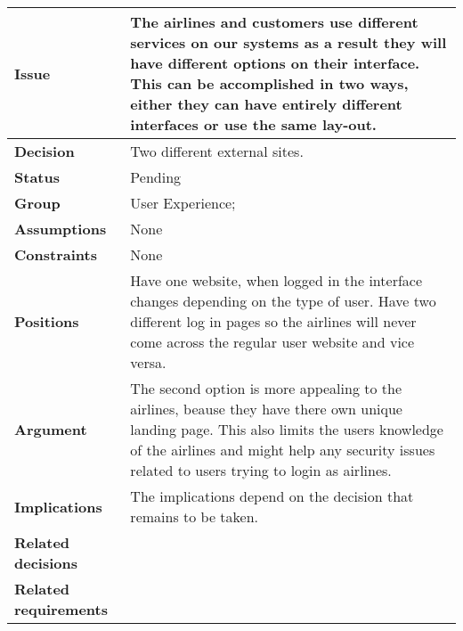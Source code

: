 
\begin{tabular}{ l  p{10cm}}
\hline
\bf Issue & The airlines and customers use different services on our systems as a result they will have different options on their interface. This can be accomplished in two ways, either they can have entirely different interfaces or use the same lay-out. \\
\hline
\bf Decision & Two different external sites.\\
\hline
\bf Status & Pending\\
\hline
\bf Group & User Experience;  \\
\hline
\bf Assumptions & None \\
\hline
\bf Constraints & None\\
\hline
\bf Positions &  Have one website, when logged in the interface changes depending on the type of user. \newline\newline
Have two different log in pages so the airlines will never come across the regular user website and vice versa.
\\
\hline
\bf Argument & The second option is more appealing to the airlines, beause they have there own unique landing page. This also limits the users knowledge of the airlines and might help any security issues related to users trying to login as airlines. \\
\hline
\bf Implications & The implications depend on the decision that remains to be taken. \\
\hline
\bf Related decisions & \\
\hline
\bf Related requirements  & \\
\hline
\end{tabular}

